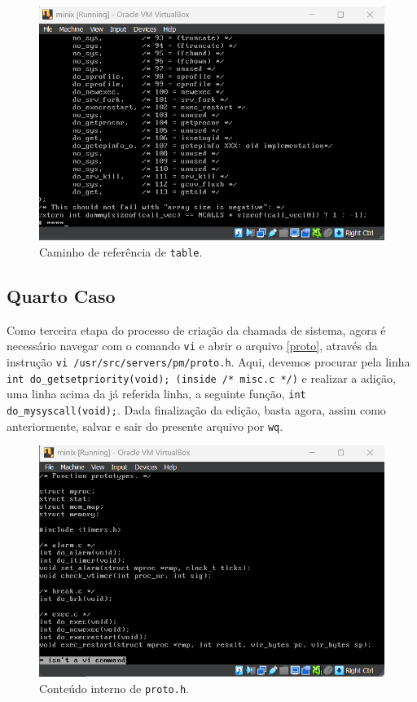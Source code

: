 \documentclass[12pt]{article}
\begin{document}
\begin{figure}[htbp]
    \centering
    \includegraphics[scale=0.6]{out/fig/Screenshot 2024-12-23 151307}
    \caption{Caminho de referência de \texttt{table}.}
    \label{fig3}
\end{figure}

\subsection{Quarto Caso} \label{sec:4sec}

Como terceira etapa do processo de criação da chamada de sistema, agora é necessário navegar com o comando \lstinline{vi} e abrir o arquivo \ref{proto}, através da instrução
\lstinline{vi /usr/src/servers/pm/proto.h}. Aqui, devemos procurar pela linha \lstinline{int do_getsetpriority(void); (inside /* misc.c */)} e realizar a adição, uma linha acima da já referida
linha, a seguinte função, \lstinline{int do_mysyscall(void);}. Dada finalização da edição, basta agora, assim como anteriormente, salvar e sair do presente arquivo por \lstinline{wq}.

\begin{figure}[htbp]
    \centering
    \includegraphics[scale=0.6]{out/fig/Screenshot 2024-12-23 113814}
    \caption{Conteúdo interno de \texttt{proto.h}.}
    \label{fig2}
\end{figure}
\end{document}
